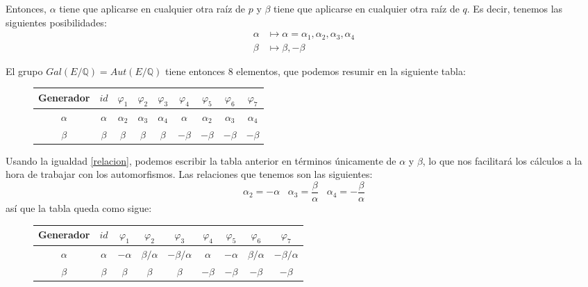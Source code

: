\documentclass[a4paper, 11pt]{article}
\begin{document}
\begin{solucion}
      Entonces, $\alpha$ tiene que aplicarse en cualquier otra raíz de $p$ y $\beta$ tiene que aplicarse en cualquier otra raíz de $q$. Es decir, tenemos las siguientes posibilidades:
      \begin{align*}
          \alpha &\longmapsto \alpha = \alpha_1, \alpha_2, \alpha_3, \alpha_4 \\
          \beta &\longmapsto \beta, -\beta
      \end{align*}

      El grupo $Gal(E/\mathbb{Q}) = Aut(E/\mathbb{Q})$ tiene entonces 8 elementos, que podemos resumir en la siguiente tabla:

      \begin{figure}[ht]
          \centering
          \begin{tabular}{c || *{7}{c|} c}
              Generador & $id$ & $\varphi_1$ & $\varphi_2$ & $\varphi_3$ & $\varphi_4$  & $\varphi_5$ & $\varphi_6$ & $\varphi_7$ \\
              \hline
              $\alpha$ & $\alpha$ & $\alpha_2$ & $\alpha_3$ & $\alpha_4$ & $\alpha$ & $\alpha_2$ & $\alpha_3$ & $\alpha_4$  \\
              $\beta$ & $\beta$ & $\beta$ & $\beta$ & $\beta$ & $-\beta$ & $-\beta$ & $-\beta$ & $-\beta$  \\
          \end{tabular}
      \end{figure}

      Usando la igualdad \ref{relacion}, podemos escribir la tabla anterior en términos únicamente de $\alpha$ y $\beta$, lo que nos facilitará los cálculos a la hora de trabajar con los automorfismos. Las relaciones que tenemos son las siguientes:
      \[
          \alpha_2 = -\alpha \;\;\; \alpha_3 = \frac{\beta}{\alpha} \;\;\; \alpha_4 = -\frac{\beta}{\alpha}
      \]
      así que la tabla queda como sigue:

      \begin{figure}[ht]
          \centering
          \begin{tabular}{c || *{7}{c|} c}
              Generador & $id$ & $\varphi_1$ & $\varphi_2$ & $\varphi_3$ & $\varphi_4$  & $\varphi_5$ & $\varphi_6$ & $\varphi_7$ \\
              \hline
              $\alpha$ & $\alpha$ & $-\alpha$ & $\beta/\alpha$ & $-\beta/\alpha$ & $\alpha$ & $-\alpha$ & $\beta/\alpha$ & $-\beta/\alpha$  \\[5pt]
              $\beta$ & $\beta$ & $\beta$ & $\beta$ & $\beta$ & $-\beta$ & $-\beta$ & $-\beta$ & $-\beta$  \\
          \end{tabular}
      \end{figure}


\end{solucion}
\end{document}
